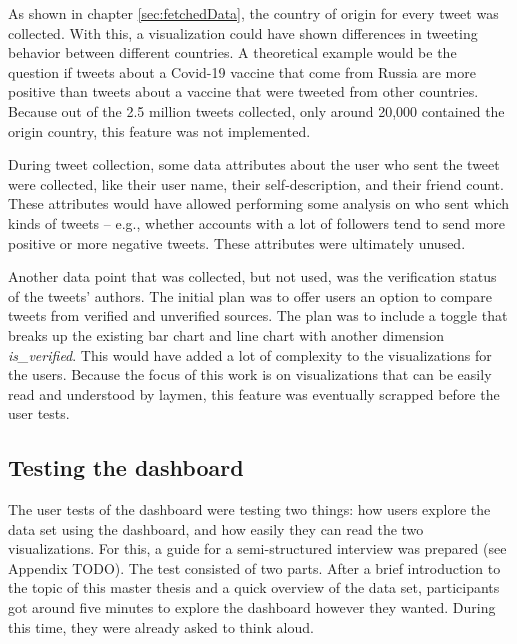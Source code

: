 As shown in chapter \ref{sec:fetchedData}, the country of origin for every tweet was collected. With this, a visualization could have shown differences in tweeting behavior between different countries. A theoretical example would be the question if tweets about a Covid-19 vaccine that come from Russia are more positive than tweets about a vaccine that were tweeted from other countries. Because out of the 2.5 million tweets collected, only around 20,000 contained the origin country, this feature was not implemented.

During tweet collection, some data attributes about the user who sent the tweet were collected, like their user name, their self-description, and their friend count. These attributes would have allowed performing some analysis on who sent which kinds of tweets – e.g., whether accounts with a lot of followers tend to send more positive or more negative tweets. These attributes were ultimately unused.

Another data point that was collected, but not used, was the verification status of the tweets' authors. The initial plan was to offer users an option to compare tweets from verified and unverified sources. The plan was to include a toggle that breaks up the existing bar chart and line chart with another dimension \emph{is\_verified}. This would have added a lot of complexity to the visualizations for the users. Because the focus of this work is on visualizations that can be easily read and understood by laymen, this feature was eventually scrapped before the user tests.

\subsection{Testing the dashboard}
The user tests of the dashboard were testing two things: how users explore the data set using the dashboard, and how easily they can read the two visualizations. For this, a guide for a semi-structured interview was prepared (see Appendix TODO). %
The test consisted of two parts. After a brief introduction to the topic of this master thesis and a quick overview of the data set, participants got around five minutes to explore the dashboard however they wanted. During this time, they were already asked to think aloud.


